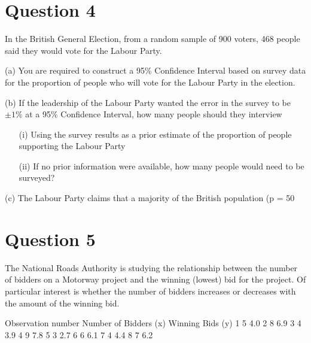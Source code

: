 \documentclass[]{report}
\begin{document}
\begin{enumerate}[(i)]
\begin{itemize}
	
	
	\section{Question 4}
	In the British General Election, from a random sample of 900 voters, 468 people said they would vote for the Labour Party.  
	
	(a) 	You are required to construct a 95\% Confidence Interval based on survey data for the proportion of people who will vote for the Labour Party in the election.
	
	(b)	If the leadership of the Labour Party wanted the error in the survey to be $\pm 1\%$ at a 95\% Confidence Interval, how many people should they interview
	
	\begin{itemize}
		\item[(i)]	Using the survey results as a prior estimate of the proportion of people supporting the Labour Party
		\item[(ii)]	If no prior information were available, how many people would need to be surveyed?
	\end{itemize}
	(c)	The Labour Party claims that a majority of the British population (p = 50%
	
	
	\section{Question 5} 
	
	The National Roads Authority is studying the relationship between the number of bidders on a Motorway project and the winning (lowest) bid for the project.  Of particular interest is whether the number of bidders increases or decreases with the amount of the winning bid.
	
	Observation number 	Number of Bidders (x)	Winning Bids
	(y)
	1	5	4.0
	2	8	6.9
	3	4	3.9
	4	9	7.8
	5	3	2.7
	6	6	6.1
	7	4	4.4
	8	7	6.2
	

\end{itemize}
\end{enumerate}
\end{document}
